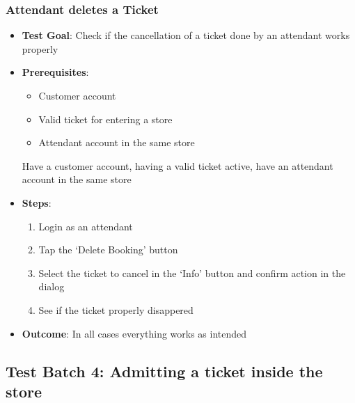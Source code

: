 \subsubsection{Attendant deletes a Ticket}
\begin{itemize}
    \item \textbf{Test Goal}: Check if the cancellation of a ticket done by an attendant works properly
    \item \textbf{Prerequisites}:
        \begin{itemize}
            \item Customer account
            \item Valid ticket for entering a store
            \item Attendant account in the same store
        \end{itemize} Have a customer account, having a valid ticket active, have an attendant account in the same store
    \item \textbf{Steps}:
        \begin{enumerate}
            \item Login as an attendant
            \item Tap the `Delete Booking' button
            \item Select the ticket to cancel in the `Info' button and confirm action in the dialog
            \item See if the ticket properly disappered
        \end{enumerate}
    \item \textbf{Outcome}: In all cases everything works as intended
    \end{itemize}


\subsection{Test Batch 4: Admitting a ticket inside the store}
